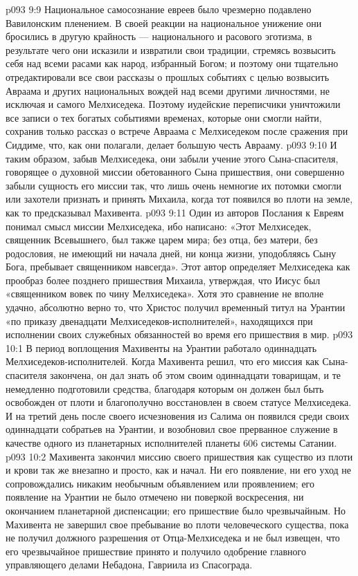 \vs p093 9:9 \pc Национальное самосознание евреев было чрезмерно подавлено Вавилонским пленением. В своей реакции на национальное унижение они бросились в другую крайность --- национального и расового эготизма, в результате чего они исказили и извратили свои традиции, стремясь возвысить себя над всеми расами как народ, избранный Богом; и поэтому они тщательно отредактировали все свои рассказы о прошлых событиях с целью возвысить Авраама и других национальных вождей над всеми другими личностями, не исключая и самого Мелхиседека. Поэтому иудейские переписчики уничтожили все записи о тех богатых событиями временах, которые они смогли найти, сохранив только рассказ о встрече Авраама с Мелхиседеком после сражения при Сиддиме, что, как они полагали, делает большую честь Аврааму.
\vs p093 9:10 И таким образом, забыв Мелхиседека, они забыли учение этого Сына\hyp{}спасителя, говорящее о духовной миссии обетованного Сына пришествия, они совершенно забыли сущность его миссии так, что лишь очень немногие их потомки смогли или захотели признать и принять Михаила, когда тот появился во плоти на земле, как то предсказывал Махивента.
\vs p093 9:11 Один из авторов Послания к Евреям понимал смысл миссии Мелхиседека, ибо написано: «Этот Мелхиседек, священник Всевышнего, был также царем мира; без отца, без матери, без родословия, не имеющий ни начала дней, ни конца жизни, уподобляясь Сыну Бога, пребывает священником навсегда». Этот автор определяет Мелхиседека как прообраз более позднего пришествия Михаила, утверждая, что Иисус был «священником вовек по чину Мелхиседека». Хотя это сравнение не вполне удачно, абсолютно верно то, что Христос получил временный титул на Урантии «по приказу двенадцати Мелхиседеков\hyp{}исполнителей», находящихся при исполнении своих служебных обязанностей во время его пришествия в мир.
\vs p093 10:1 В период воплощения Махивенты на Урантии работало одиннадцать Мелхиседеков\hyp{}исполнителей. Когда Махивента решил, что его миссия как Сына\hyp{}спасителя закончена, он дал знать об этом своим одиннадцати товарищам, и те немедленно подготовили средства, благодаря которым он должен был быть освобожден от плоти и благополучно восстановлен в своем статусе Мелхиседека. И на третий день после своего исчезновения из Салима он появился среди своих одиннадцати собратьев на Урантии, и возобновил свое прерванное служение в качестве одного из планетарных исполнителей планеты 606 системы Сатании.
\vs p093 10:2 Махивента закончил миссию своего пришествия как существо из плоти и крови так же внезапно и просто, как и начал. Ни его появление, ни его уход не сопровождались никаким необычным объявлением или проявлением; его появление на Урантии не было отмечено ни поверкой воскресения, ни окончанием планетарной диспенсации; его пришествие было чрезвычайным. Но Махивента не завершил свое пребывание во плоти человеческого существа, пока не получил должного разрешения от Отца\hyp{}Мелхиседека и не был извещен, что его чрезвычайное пришествие принято и получило одобрение главного управляющего делами Небадона, Гавриила из Спасограда.
